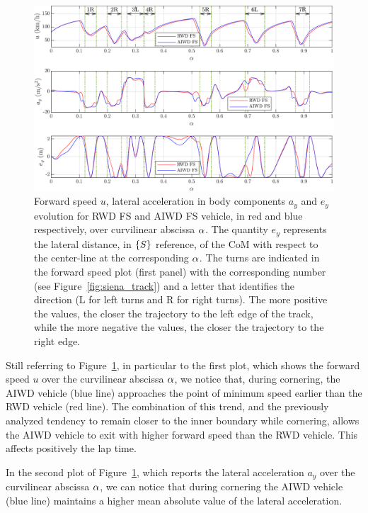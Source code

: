 \begin{figure}[h]
	\centering
	\includegraphics[scale = .8]{Images/DrivingStyles/rwdfsaiwdfs_p.pdf}
	\caption{
		Forward speed $u$, lateral acceleration in body components $a_y$ and $e_y$ evolution for RWD FS and AIWD FS vehicle, in red and blue respectively, over curvilinear abscissa $\alpha$. The quantity $e_y$ represents the lateral distance, in $\left\{S\right\}$ reference, of the CoM with respect to the center-line at the corresponding $\alpha$.
		The turns are indicated in the forward speed plot (first panel) with the corresponding number (see Figure~\ref{fig:siena_track}) and a letter that identifies the direction (L for left turns and R for right turns). The more positive the values, the closer the trajectory to the left edge of the track, while the more negative the values, the closer the trajectory to the right edge.}
	\label{fig:rwdfs_awdfs_uayey}
\end{figure}

Still referring to Figure~\ref{fig:rwdfs_awdfs_uayey}, in particular to the first plot, which shows the forward speed $u$ over the curvilinear abscissa $\alpha$, we notice that, during cornering, the AIWD vehicle (blue line) approaches the point of minimum speed earlier than the RWD vehicle (red line).
The combination of this trend, and the previously analyzed tendency to remain closer to the inner boundary while cornering, allows the AIWD vehicle to exit with higher forward speed than the RWD vehicle. This affects positively the lap time.

In the second plot of Figure~\ref{fig:rwdfs_awdfs_uayey}, which reports the lateral acceleration $a_y$ over the curvilinear abscissa $\alpha$, we can notice that during cornering the AIWD vehicle (blue line) maintains a higher mean absolute value of the lateral acceleration.

